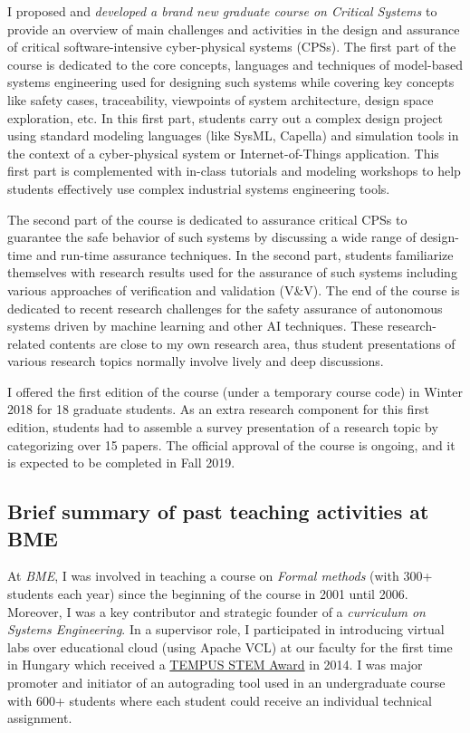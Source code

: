 \documentclass[a4paper,11pt]{article}
\begin{document}
I proposed and \emph{developed a brand new graduate course on Critical Systems} to provide an overview of main challenges and activities in the design and assurance of critical software-intensive cyber-physical systems (CPSs). The first part of the course is dedicated to the core concepts, languages and techniques of model-based systems engineering used for designing such systems while covering key concepts like safety cases, traceability, viewpoints of system architecture, design space exploration, etc. In this first part, students carry out a complex design project using standard modeling languages (like SysML, Capella) and simulation tools in the context of a cyber-physical system or Internet-of-Things application. This first part is complemented with in-class tutorials and modeling workshops to help students effectively use complex industrial systems engineering tools.

The second part of the course is dedicated to assurance critical CPSs to guarantee the safe behavior of such systems by discussing a wide range of design-time and run-time assurance techniques. In the second part, students familiarize themselves with research results used for the assurance of such systems including various approaches of verification and validation (V\&V). The end of the course is dedicated to recent research challenges for the safety assurance of autonomous systems driven by machine learning and other AI techniques. These research-related contents are close to my own research area, thus student presentations of various research topics normally involve lively and deep discussions. 

I offered the first edition of the course (under a temporary course code) in Winter 2018 for 18 graduate students. As an extra research component for this first edition, students had to assemble a survey presentation of a research topic by categorizing over 15 papers. The official approval of the course is ongoing, and it is expected to be completed in Fall 2019. 

\subsection{Brief summary of past teaching activities at BME}

At \emph{BME}, I was involved in teaching a course on \emph{Formal methods} (with 300+ students each year) since the beginning of the course in 2001 until 2006. Moreover, I was a key contributor and strategic founder of a \emph{curriculum on Systems Engineering}. In a supervisor role, I participated in introducing virtual labs over educational cloud (using Apache VCL) at our faculty for the first time in Hungary which received a \href{https://inf.mit.bme.hu/en/news/2014/02/tempus-stem-call-apache-vcl-based-labs-won-prize}{TEMPUS STEM Award} in 2014. I was major promoter and initiator of an autograding tool used in an undergraduate course with 600+ students where each student could receive an individual technical assignment. 
\end{document}
